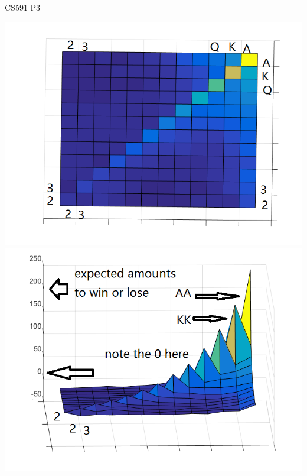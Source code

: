 \documentclass[12pt]{article}
\begin{document}
\begin{center}
\large{CS591 P3}
\end {center}

\includegraphics[scale=.5]{score}
\includegraphics[scale=.5]{score1}
\end{document}

